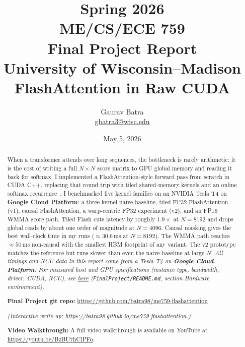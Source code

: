 \documentclass[12pt]{article}
\title{\vspace{-2em}%
{\large Spring 2026}\\
{\large ME/CS/ECE 759}\\
[1.5ex]
{\Large Final Project Report}\\[1ex]
{\large University of Wisconsin--Madison}\\[2ex]
{\Large FlashAttention in Raw CUDA}\\[2ex]
}
\author{Gaurav Batra \\ \href{mailto:gbatra3@wisc.edu}{gbatra3@wisc.edu}}
\date{May 5, 2026}
\begin{document}
\maketitle
\thispagestyle{empty}

\begin{abstract}
\noindent
When a transformer attends over long sequences, the bottleneck is rarely arithmetic: it is the cost of writing a full $N{\times}N$ score matrix to GPU global memory and reading it back for softmax. I implemented a FlashAttention-style forward pass from scratch in CUDA C++, replacing that round trip with tiled shared-memory kernels and an online softmax recurrence~\cite{dao2022,milakov2018}. I benchmarked five kernel families on an NVIDIA Tesla T4 on \textbf{Google Cloud Platform}: a three-kernel naive baseline, tiled FP32 FlashAttention (v1), causal FlashAttention, a warp-centric FP32 experiment (v2), and an FP16 WMMA score path. Tiled Flash cuts latency by roughly $1.9\times$ at $N{=}8192$ and drops global reads by about one order of magnitude at $N{=}4096$. Causal masking gives the best wall-clock time in my runs ($\approx 30.6$\,ms at $N{=}8192$). The WMMA path reaches $\approx 50$\,ms non-causal with the smallest HBM footprint of any variant. The v2 prototype matches the reference but runs slower than even the naive baseline at large $N$.
\textit{All timings and NCU data in this report come from a Tesla T4 on \textbf{Google Cloud Platform}. For measured host and GPU specifications (instance type, bandwidth, driver, CUDA, NCU), see \href{https://github.com/batra98/me759-flashattention/blob/main/FinalProject/README.md\#hardware-environment}{here} (\texttt{FinalProject/README.md}, section \emph{Hardware environment}).}

\medskip
\noindent\textbf{Final Project git repo:} \url{https://github.com/batra98/me759-flashattention}

\medskip
\noindent\textit{(Interactive write-up: \url{https://batra98.github.io/me759-flashattention}.)}

\medskip
\noindent\textbf{Video Walkthrough:} A full video walkthrough is available on YouTube at \url{https://youtu.be/BzBU7hClPFo}.
\end{abstract}

\clearpage
\setcounter{page}{1}
\tableofcontents
\clearpage
\end{document}
